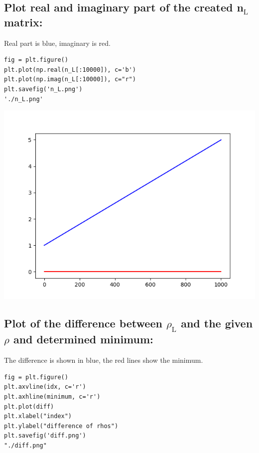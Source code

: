\documentclass[11pt]{article}
\begin{document}
\subsection{Plot real and imaginary part of the created n\(_{\text{L}}\) matrix:}
\label{sec:org2936250}

Real part is blue, imaginary is red.

\begin{verbatim}
fig = plt.figure()
plt.plot(np.real(n_L[:10000]), c='b')
plt.plot(np.imag(n_L[:10000]), c="r")
plt.savefig('n_L.png')
'./n_L.png'
\end{verbatim}

\begin{center}
\includegraphics[width=.9\linewidth]{./n_L.png}
\end{center}

\subsection{Plot of the difference between \(\rho_{\text{L}}\) and the given \(\rho\) and determined minimum:}
\label{sec:org8c54f34}

The difference is shown in blue, the red lines show the minimum.

\begin{verbatim}
fig = plt.figure()
plt.axvline(idx, c='r')
plt.axhline(minimum, c='r')
plt.plot(diff)
plt.xlabel("index")
plt.ylabel("difference of rhos")
plt.savefig('diff.png')
"./diff.png"
\end{verbatim}
\end{document}
